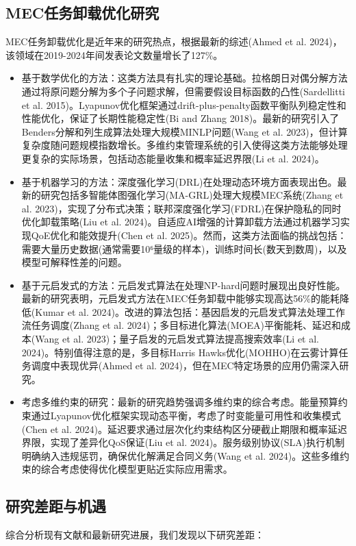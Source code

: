 \documentclass[conference]{IEEEtran}
\begin{document}
\subsection{MEC任务卸载优化研究}
MEC任务卸载优化是近年来的研究热点，根据最新的综述(Ahmed et al. 2024)，该领域在2019-2024年间发表论文数量增长了127\%。
\begin{itemize}
    \item 基于数学优化的方法：这类方法具有扎实的理论基础。拉格朗日对偶分解方法通过将原问题分解为多个子问题求解，但需要假设目标函数的凸性(Sardellitti et al. 2015)。Lyapunov优化框架通过drift-plus-penalty函数平衡队列稳定性和性能优化，保证了长期性能稳定性(Bi and Zhang 2018)。最新的研究引入了Benders分解和列生成算法处理大规模MINLP问题(Wang et al. 2023)，但计算复杂度随问题规模指数增长。多维约束管理系统的引入使得这类方法能够处理更复杂的实际场景，包括动态能量收集和概率延迟界限(Li et al. 2024)。
    \item 基于机器学习的方法：深度强化学习(DRL)在处理动态环境方面表现出色。最新的研究包括多智能体图强化学习(MA-GRL)处理大规模MEC系统(Zhang et al. 2023)，实现了分布式决策；联邦深度强化学习(FDRL)在保护隐私的同时优化卸载策略(Liu et al. 2024)。自适应AI增强的计算卸载方法通过机器学习实现QoE优化和能效提升(Chen et al. 2025)。然而，这类方法面临的挑战包括：需要大量历史数据(通常需要10⁶量级的样本)，训练时间长(数天到数周)，以及模型可解释性差的问题。
    \item 基于元启发式的方法：元启发式算法在处理NP-hard问题时展现出良好性能。最新的研究表明，元启发式方法在MEC任务卸载中能够实现高达56\%的能耗降低(Kumar et al. 2024)。改进的算法包括：基因启发的元启发式算法处理工作流任务调度(Zhang et al. 2024)；多目标进化算法(MOEA)平衡能耗、延迟和成本(Wang et al. 2023)；量子启发的元启发式算法提高搜索效率(Li et al. 2024)。特别值得注意的是，多目标Harris Hawks优化(MOHHO)在云雾计算任务调度中表现优异(Ahmed et al. 2024)，但在MEC特定场景的应用仍需深入研究。
    \item 考虑多维约束的研究：最新的研究趋势强调多维约束的综合考虑。能量预算约束通过Lyapunov优化框架实现动态平衡，考虑了时变能量可用性和收集模式(Chen et al. 2024)。延迟要求通过层次化约束结构区分硬截止期限和概率延迟界限，实现了差异化QoS保证(Liu et al. 2024)。服务级别协议(SLA)执行机制明确纳入违规惩罚，确保优化解满足合同义务(Wang et al. 2024)。这些多维约束的综合考虑使得优化模型更贴近实际应用需求。
\end{itemize}

\subsection{研究差距与机遇}
综合分析现有文献和最新研究进展，我们发现以下研究差距：
\end{document}
